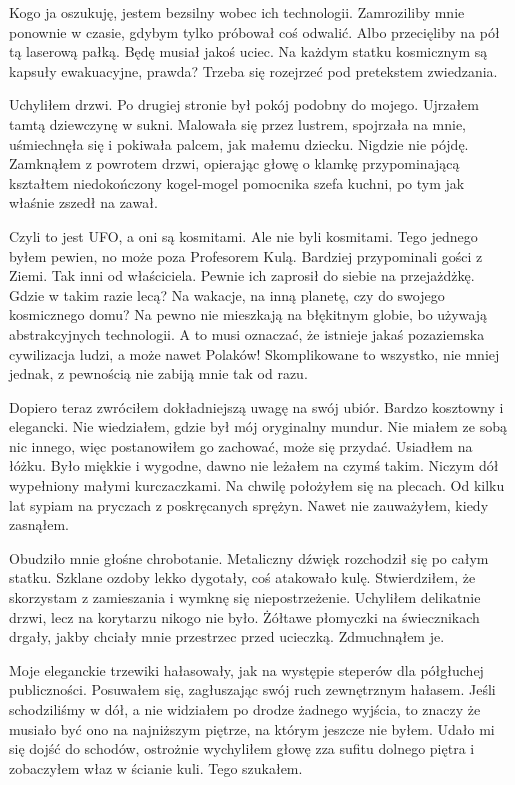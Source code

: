 Kogo ja oszukuję, jestem bezsilny wobec ich technologii.
Zamroziliby mnie ponownie w czasie, gdybym tylko próbował coś odwalić.
Albo przecięliby na pół tą laserową pałką.
Będę musiał jakoś uciec. Na każdym statku kosmicznym są kapsuły ewakuacyjne, prawda?
Trzeba się rozejrzeć pod pretekstem zwiedzania.

Uchyliłem drzwi. Po drugiej stronie był pokój podobny do mojego.
Ujrzałem tamtą dziewczynę w sukni.
Malowała się przez lustrem, spojrzała na mnie, uśmiechnęła się i pokiwała palcem, jak małemu dziecku.
Nigdzie nie pójdę. Zamknąłem z powrotem drzwi, opierając głowę o klamkę przypominającą kształtem niedokończony kogel-mogel pomocnika szefa kuchni, po tym jak właśnie zszedł na zawał.

Czyli to jest UFO, a oni są kosmitami.
Ale nie byli kosmitami. Tego jednego byłem pewien, no może poza Profesorem Kulą.
Bardziej przypominali gości z Ziemi. Tak inni od właściciela. Pewnie ich zaprosił do siebie na przejażdżkę.
Gdzie w takim razie lecą?
Na wakacje, na inną planetę, czy do swojego kosmicznego domu?
Na pewno nie mieszkają na błękitnym globie, bo używają abstrakcyjnych technologii.
A to musi oznaczać, że istnieje jakaś pozaziemska cywilizacja ludzi, a może nawet Polaków!
Skomplikowane to wszystko, nie mniej jednak, z pewnością nie zabiją mnie tak od razu.

Dopiero teraz zwróciłem dokładniejszą uwagę na swój ubiór.
Bardzo kosztowny i elegancki. Nie wiedziałem, gdzie był mój oryginalny mundur. 
Nie miałem ze sobą nic innego, więc postanowiłem go zachować, może się przydać.
Usiadłem na łóżku. Było miękkie i wygodne, dawno nie leżałem na czymś takim. Niczym dół wypełniony małymi kurczaczkami. Na chwilę położyłem się na plecach.
Od kilku lat sypiam na pryczach z poskręcanych sprężyn.
Nawet nie zauważyłem, kiedy zasnąłem.

Obudziło mnie głośne chrobotanie. Metaliczny dźwięk rozchodził się po całym statku.
Szklane ozdoby lekko dygotały, coś atakowało kulę.
Stwierdziłem, że skorzystam z zamieszania i wymknę się niepostrzeżenie.
Uchyliłem delikatnie drzwi, lecz na korytarzu nikogo nie było. Żółtawe płomyczki na świecznikach drgały, jakby chciały mnie przestrzec przed ucieczką. Zdmuchnąłem je.

Moje eleganckie trzewiki hałasowały, jak na występie steperów dla półgłuchej publiczności.
Posuwałem się, zagłuszając swój ruch zewnętrznym hałasem.
Jeśli schodziliśmy w dół, a nie widziałem po drodze żadnego wyjścia, to znaczy że musiało być ono na najniższym piętrze, na którym jeszcze nie byłem.
Udało mi się dojść do schodów, ostrożnie wychyliłem głowę zza sufitu dolnego piętra i zobaczyłem właz w ścianie kuli.
Tego szukałem.

